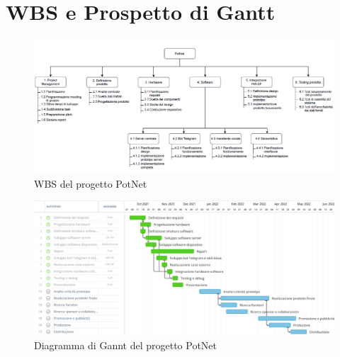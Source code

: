 \newpage
\section{WBS e Prospetto di Gantt}

\begin{figure}[ht!]
	\centering
	\includegraphics[width=\textwidth]{./images/wbs.PNG} 
	\caption{WBS del progetto PotNet \label{overflow}}
\end{figure}

\begin{figure}[ht!]
	\centering
	\includegraphics[angle=-90,origin=c,scale=1.2]{./images/Gannt.PNG} 
	\caption{Diagramma di Gannt del progetto PotNet \label{overflow}}
\end{figure}
